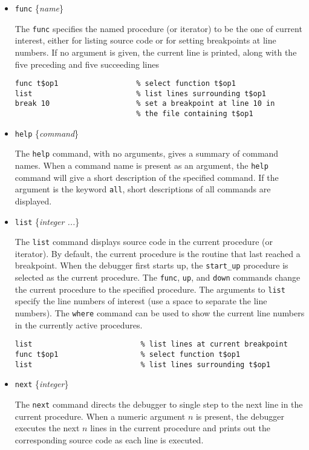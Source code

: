 \begin{itemize}
\item {\tt func} \{{\it name}\}

The {\tt func} specifies the named procedure (or iterator) to be the one of
current interest, either for listing source code or for setting breakpoints at
line numbers.  If no argument is given, the current line is printed, along with
the five preceding and five succeeding lines
\begin{verbatim}
func t$op1                  % select function t$op1
list                        % list lines surrounding t$op1
break 10                    % set a breakpoint at line 10 in 
                            % the file containing t$op1
\end{verbatim}

\item {\tt help} \{{\it command}\}

The {\tt help} command, with no arguments, gives a summary of command names.
When a command name is present as an argument, the {\tt help} command will give
a short description of the specified command.  If the argument is the keyword
{\tt all}, short descriptions of all commands are displayed.

\item {\tt list} \{{\it integer ...}\}

The {\tt list} command displays source code in the current procedure (or
iterator).  By default, the current procedure is the routine that last reached
a breakpoint.  When the debugger first starts up, the {\tt start\_up} procedure
is selected as the current procedure.  The {\tt func}, {\tt up}, and {\tt down} commands change the
current procedure to the specified procedure.  The arguments to {\tt list}
specify the line numbers of interest (use a space to separate the line
numbers).  The {\tt where} command can be used to show the current line numbers
in the currently active procedures.
\begin{verbatim}
list                         % list lines at current breakpoint
func t$op1                   % select function t$op1
list                         % list lines surrounding t$op1
\end{verbatim}

\item {\tt next} \{{\it integer}\}

The {\tt next} command directs the debugger to single step to the next line in
the current procedure.  When a numeric argument $n$ is present, the debugger
executes the next $n$ lines in the current procedure and prints out the
corresponding source code as each line is executed.


\end{itemize}
